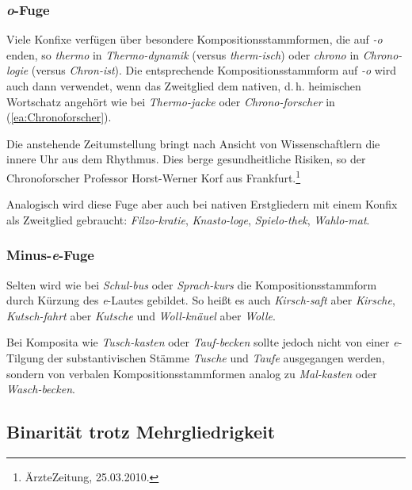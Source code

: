 \subsubsection{\textit{o}-Fuge}\label{subsubsection:o-Fuge}

Viele Konfixe verfügen über besondere Kompositionsstammformen, die auf \textit{-o} enden, so \zB \textit{thermo} in \textit{Thermo-dynamik} (versus \textit{therm-isch}) oder \textit{chrono} in \textit{Chrono-logie} (versus \textit{Chron-ist}). Die entsprechende Kompositionsstammform auf \textit{-o} wird auch dann verwendet, wenn das Zweitglied dem nativen, d.\,h. heimischen Wortschatz angehört wie bei \textit{Thermo-jacke} oder \textit{Chrono-forscher} in (\ref{ea:Chronoforscher}). 

\ea \label{ea:Chronoforscher} Die anstehende Zeitumstellung bringt nach Ansicht von Wissenschaftlern die innere Uhr aus dem Rhythmus. Dies berge gesundheitliche Risiken, so der Chronoforscher Professor Horst-Werner Korf aus Frankfurt.\footnote{ÄrzteZeitung, 25.03.2010.}
\z 
 
Analogisch wird diese Fuge aber auch bei nativen Erstgliedern mit einem Konfix als Zweitglied gebraucht: \textit{Filzo-kratie}, \textit{Knasto-loge}, \textit{Spielo-thek}, \textit{Wahlo-mat}.


\subsubsection{Minus-\textit{e}-Fuge}\label{subsubsection:Minus-Fuge}

Selten wird wie bei \textit{Schul-bus} oder \textit{Sprach-kurs} die Kompositionsstammform durch Kürzung des \textit{e}-Lautes gebildet. So heißt es auch \textit{Kirsch-saft} aber \textit{Kirsche}, \textit{Kutsch-fahrt} aber \textit{Kutsche} und \textit{Woll-knäuel} aber \textit{Wolle}.  

Bei Komposita wie \textit{Tusch-kasten} oder \textit{Tauf-becken} sollte jedoch nicht von einer \textit{e}-Tilgung der substantivischen Stämme \textit{Tusche} und \textit{Taufe} ausgegangen werden, sondern von verbalen Kompositionsstammformen analog zu \textit{Mal-kasten} oder \textit{Wasch-becken}. 



\subsection{Binarität trotz Mehrgliedrigkeit}\label{subsection:Binarität}
 
